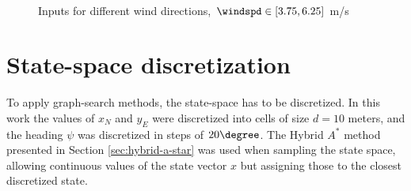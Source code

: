 \begin{figure}
    \centering
    \\
    \caption{Inputs for different wind directions, $\windspd\in[3.75, 6.25]$ m/s}
    \label{fig:motion_prims}
\end{figure}

\section{State-space discretization}
To apply graph-search methods, the state-space has to be discretized. In this work the values of $x_N$ and $y_E$ were discretized into cells of size $d=10$ meters, and the 
heading $\psi$ was discretized in steps of $20\degree$. The Hybrid $A^*$ method presented in Section \ref{sec:hybrid-a-star} was used when sampling the state space, allowing continuous values of the state vector $x$ but assigning those to the closest 
discretized state.

